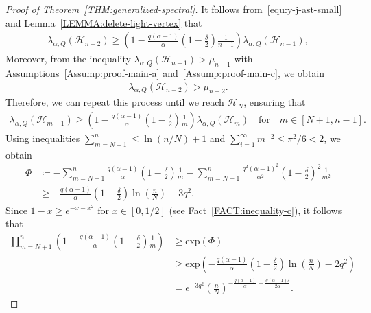 \documentclass[11pt,a4paper]{article}
\begin{document}
\begin{proof}[Proof of Theorem~\ref{THM:generalized-spectral}]
    It follows from~\eqref{equ:y-j-ast-small} and Lemma~\ref{LEMMA:delete-light-vertex} that 
    \begin{align*}%
        \lambda_{\alpha, Q}(\mathcal{H}_{n-2})
        \ge \left(1-\frac{q(\alpha-1)}{\alpha}\left(1-\frac{\delta}{2}\right) \frac{1}{n-1}\right) \lambda_{\alpha, Q}(\mathcal{H}_{n-1}),
    \end{align*}
    Moreover, from the inequality $\lambda_{\alpha, Q}(\mathcal{H}_{n-1}) > \mu_{n-1}$ with Assumptions~\ref{Assump:proof-main-a} and~\ref{Assump:proof-main-c}, we obtain  
    \begin{align*}%
        \lambda_{\alpha, Q}(\mathcal{H}_{n-2})
        > \mu_{n-2}. 
    \end{align*}
    Therefore, we can repeat this process until we reach $\mathcal{H}_{N}$, ensuring that  
    \begin{align}\label{equ:Hk-1-Hk-spectral-a}
        \lambda_{\alpha, Q}(\mathcal{H}_{m-1})
        \ge \left(1-\frac{q(\alpha-1)}{\alpha}\left(1-\frac{\delta}{2}\right) \frac{1}{m}\right) \lambda_{\alpha, Q}(\mathcal{H}_{m})
        \quad\text{for}\quad m \in [N+1, n-1].
    \end{align}
    Using inequalities $\sum_{m=N+1}^{n} \le \ln(n/N) + 1$ and $\sum_{i=1}^{\infty} m^{-2} \le \pi^2/6 < 2$, we obtain  
    \begin{align*}
        \Phi & \coloneqq -\sum_{m=N+1}^{n} \frac{q(\alpha-1)}{\alpha}\left(1-\frac{\delta}{2}\right) \frac{1}{m} - \sum_{m=N+1}^{n} \frac{q^2 (\alpha-1)^2}{\alpha^2}\left(1-\frac{\delta}{2}\right)^2\frac{1}{m^2} \\
        & \ge - \frac{q(\alpha-1)}{\alpha}\left(1-\frac{\delta}{2}\right) \ln\left(\frac{n}{N}\right) - 3 q^2. 
    \end{align*}
    Since $1-x \ge e^{-x-x^2}$ for $x\in [0,1/2]$ (see Fact~\ref{FACT:inequality-c}), it follows that 
    \begin{align*}
        \prod_{m=N+1}^{n} \left(1-\frac{q(\alpha-1)}{\alpha}\left(1-\frac{\delta}{2}\right) \frac{1}{m}\right)
        & \ge \mathrm{exp}\left(\Phi\right) \\
        & \ge \mathrm{exp}\left(- \frac{q(\alpha-1)}{\alpha}\left(1-\frac{\delta}{2}\right) \ln\left(\frac{n}{N}\right) - 2 q^2\right) \\
        & = e^{-3q^2} \left(\frac{n}{N}\right)^{-\frac{q(\alpha-1)}{\alpha} + \frac{q(\alpha-1) \delta}{2 \alpha}}. 
    \end{align*}

\end{proof}
\end{document}
